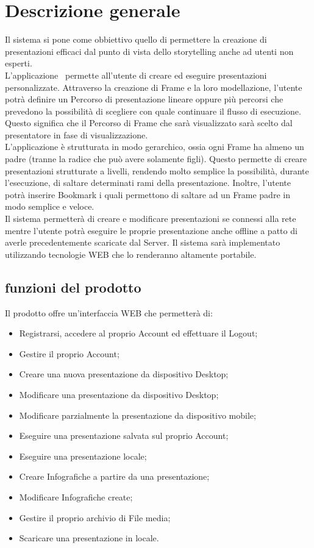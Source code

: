 \section{Descrizione generale}{
Il sistema si pone come obbiettivo quello di permettere la creazione di presentazioni efficaci dal punto di vista dello storytelling anche ad utenti non esperti. \\
L'applicazione \premi\ permette all'utente di creare ed eseguire presentazioni personalizzate. Attraverso la creazione di Frame e la loro modellazione, l'utente potrà definire un Percorso di presentazione lineare oppure più percorsi che prevedono la possibilità di scegliere con quale continuare il flusso di esecuzione. Questo significa che il Percorso di Frame che sarà visualizzato sarà scelto dal presentatore in fase di visualizzazione.\\
L'applicazione è strutturata in modo gerarchico, ossia ogni Frame ha almeno un padre (tranne la radice che può avere solamente figli). Questo permette di creare presentazioni strutturate a livelli, rendendo molto semplice la possibilità, durante l'esecuzione, di saltare determinati rami della presentazione. Inoltre, l'utente potrà inserire Bookmark i quali permettono di saltare ad un Frame padre in modo semplice e veloce.\\
Il sistema permetterà di creare e modificare presentazioni se connessi alla rete mentre l'utente potrà eseguire le proprie presentazione anche offline a patto di averle precedentemente scaricate dal Server.
Il sistema sarà implementato utilizzando tecnologie WEB che lo renderanno altamente portabile.

\subsection{funzioni del prodotto}{
	Il prodotto offre un'interfaccia WEB che permetterà di:
	\begin{itemize}
		\item Registrarsi, accedere al proprio Account ed effettuare il Logout;
		\item Gestire il proprio Account;
		\item Creare una nuova presentazione da dispositivo Desktop;
		\item Modificare una presentazione da dispositivo Desktop;
		\item Modificare parzialmente la presentazione da dispositivo mobile;
		\item Eseguire una presentazione salvata sul proprio Account;
		\item Eseguire una presentazione locale;
		\item Creare Infografiche a partire da una presentazione;
		\item Modificare Infografiche create;
		\item Gestire il proprio archivio di File media;
		\item Scaricare una presentazione in locale.
	\end{itemize}
}
}
